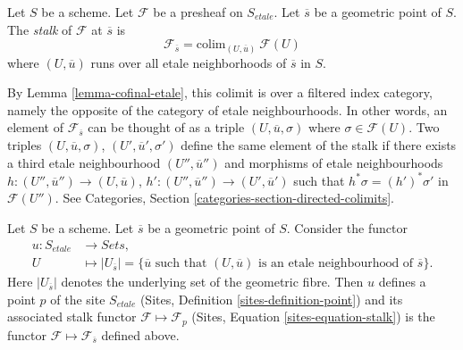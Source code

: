 \begin{definition}
\label{definition-stalk}
Let $S$ be a scheme.
Let $\mathcal{F}$ be a presheaf on $S_{etale}$.
Let $\overline{s}$ be a geometric point of $S$.
The {\it stalk} of $\mathcal{F}$ at $\overline{s}$ is
$$
\mathcal{F}_{\overline{s}}
=
\text{colim}_{(U, \overline{u})}\ \mathcal{F}(U)
$$
where $(U, \overline{u})$ runs over all etale
neighborhoods of $\overline{s}$ in $S$.
\end{definition}

\noindent
By Lemma \ref{lemma-cofinal-etale}, this colimit is over a filtered
index category, namely the opposite of the category of etale neighbourhoods.
In other words, an element of $\mathcal{F}_{\overline{s}}$ can be
thought of as a triple $(U, \overline{u}, \sigma)$ where
$\sigma \in \mathcal{F}(U)$. Two triples
$(U, \overline{u}, \sigma)$, $(U', \overline{u}', \sigma')$
define the same element of the stalk if there exists a third
etale neighbourhood $(U'', \overline{u}'')$ and morphisms of etale
neighbourhoods $h : (U'', \overline{u}'') \to (U, \overline{u})$,
$h' : (U'', \overline{u}'') \to (U', \overline{u}')$ such that
$h^*\sigma = (h')^*\sigma'$ in $\mathcal{F}(U'')$. See
Categories, Section \ref{categories-section-directed-colimits}.

\begin{lemma}
\label{lemma-stalk-gives-point}
Let $S$ be a scheme. Let $\overline{s}$ be a geometric point of $S$.
Consider the functor
\begin{align*}
u : S_{etale} & \longrightarrow \textit{Sets}, \\
U & \longmapsto
|U_{\overline{s}}|
=
\{\overline{u} \text{ such that }(U, \overline{u})
\text{ is an etale neighbourhood of }\overline{s}\}.
\end{align*}
Here $|U_{\overline{s}}|$ denotes the underlying set of the geometric fibre.
Then $u$ defines a point $p$ of the site $S_{etale}$
(Sites, Definition \ref{sites-definition-point})
and its associated stalk functor $\mathcal{F} \mapsto \mathcal{F}_p$
(Sites, Equation \ref{sites-equation-stalk})
is the functor $\mathcal{F} \mapsto \mathcal{F}_{\overline{s}}$
defined above.
\end{lemma}

